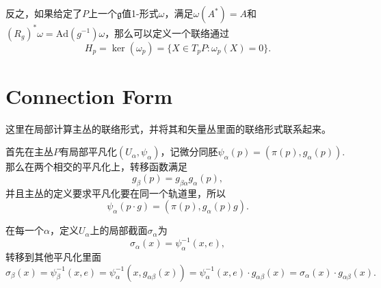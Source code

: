 反之，如果给定了$P$上一个$\mathfrak{g}$值1-形式$\omega$，满足$\omega(A^*)=A$和$(R_g)^*\omega=\mathrm{Ad}(g^{-1})\omega$，那么可以定义一个联络通过
\[
	H_p=\ker(\omega_p)=\{X\in T_p P:\omega_p(X)=0\}.
\]
\section{Connection Form}
这里在局部计算主丛的联络形式，并将其和矢量丛里面的联络形式联系起来。

首先在主丛$P$有局部平凡化$(U_\alpha,\psi_\alpha)$，记微分同胚$\psi_\alpha(p)=(\pi(p),g_\alpha(p))$.那么在两个相交的平凡化上，转移函数满足
\[
	g_\beta(p)=g_{\beta\alpha}g_\alpha(p),
\]
并且主丛的定义要求平凡化要在同一个轨道里，所以
\[
	\psi_\alpha(p\cdot g)=(\pi(p),g_\alpha(p)g).
\]

在每一个$\alpha$，定义$U_\alpha$上的局部截面$\sigma_\alpha$为
\[
	\sigma_\alpha(x)=\psi_\alpha^{-1}(x,e),
\]
转移到其他平凡化里面
\[
	\sigma_\beta(x)=\psi_\beta^{-1}(x,e)=\psi_\alpha^{-1}(x,g_{\alpha\beta}(x))=\psi_\alpha^{-1}(x,e)\cdot g_{\alpha\beta}(x)=\sigma_\alpha(x)\cdot g_{\alpha\beta}(x).
\]

